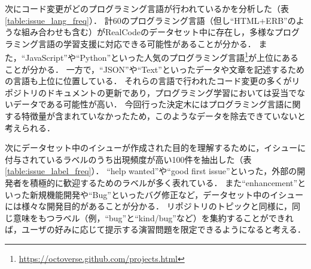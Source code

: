 次にコード変更がどのプログラミング言語が行われているかを分析した（表\ref{table:issue_lang_freq}）．
計60のプログラミング言語（但し``HTML+ERB''のような組み合わせも含む）がRealCodeのデータセット中に存在し，多様なプログラミング言語の学習支援に対応できる可能性があることが分かる．
また，``JavaScript''や``Python''といった人気のプログラミング言語\footnote{\url{https://octoverse.github.com/projects.html}}が上位にあることが分かる．
一方で，``JSON''や``Text''といったデータや文章を記述するための言語も上位に位置している．
それらの言語で行われたコード変更の多くがリポジトリのドキュメントの更新であり，プログラミング学習においては妥当でないデータである可能性が高い．
今回行った決定木にはプログラミング言語に関する特徴量が含まれていなかったため，このようなデータを除去できていないと考えられる．

次にデータセット中のイシューが作成された目的を理解するために，イシューに付与されているラベルのうち出現頻度が高い100件を抽出した（表\ref{table:issue_label_freq}）．
``help wanted''や``good first issue''といった，外部の開発者を積極的に歓迎するためのラベルが多く表れている．
また``enhancement''といった新規機能開発や``Bug''といったバグ修正など，データセット中のイシューには様々な開発目的があることが分かる．
リポジトリのトピックと同様に，同じ意味をもつラベル（例，``bug''と``kind/bug''など）を集約することができれば，ユーザの好みに応じて提示する演習問題を限定できるようになると考える．



